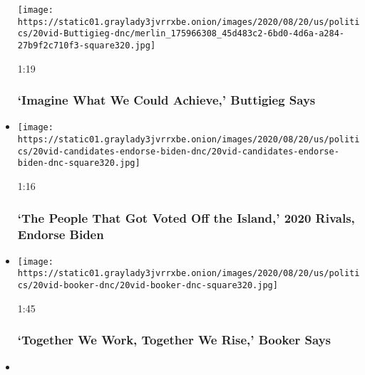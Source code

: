 \begin{itemize}
  \texttt{[image: https://static01.graylady3jvrrxbe.onion/images/2020/08/20/us/politics/20vid-Buttigieg-dnc/merlin\_175966308\_45d483c2-6bd0-4d6a-a284-27b9f2c710f3-square320.jpg]}

  1:19

  \hypertarget{imagine-what-we-could-achieve-buttigieg-says}{%
  \subsubsection{`Imagine What We Could Achieve,' Buttigieg
  Says}\label{imagine-what-we-could-achieve-buttigieg-says}}
\item
  \href{https://www.nytimes3xbfgragh.onion/video/us/elections/100000007299914/2020-candidates-endorse-biden-dnc.html?action=click\&module=video-series-bar\&region=header\&pgtype=Article\&playlistId=video/2020-Elections}{}

  \texttt{[image: https://static01.graylady3jvrrxbe.onion/images/2020/08/20/us/politics/20vid-candidates-endorse-biden-dnc/20vid-candidates-endorse-biden-dnc-square320.jpg]}

  1:16

  \hypertarget{the-people-that-got-voted-off-the-island-2020-rivals-endorse-biden}{%
  \subsubsection{`The People That Got Voted Off the Island,' 2020
  Rivals, Endorse
  Biden}\label{the-people-that-got-voted-off-the-island-2020-rivals-endorse-biden}}
\item
  \href{https://www.nytimes3xbfgragh.onion/video/us/elections/100000007299801/cory-booker-speaks-dnc.html?action=click\&module=video-series-bar\&region=header\&pgtype=Article\&playlistId=video/2020-Elections}{}

  \texttt{[image: https://static01.graylady3jvrrxbe.onion/images/2020/08/20/us/politics/20vid-booker-dnc/20vid-booker-dnc-square320.jpg]}

  1:45

  \hypertarget{together-we-work-together-we-rise-booker-says}{%
  \subsubsection{`Together We Work, Together We Rise,' Booker
  Says}\label{together-we-work-together-we-rise-booker-says}}
\item
  \href{https://www.nytimes3xbfgragh.onion/video/us/elections/100000007299848/tammy-duckworth-speaks-dnc.html?action=click\&module=video-series-bar\&region=header\&pgtype=Article\&playlistId=video/2020-Elections}{}


\end{itemize}
